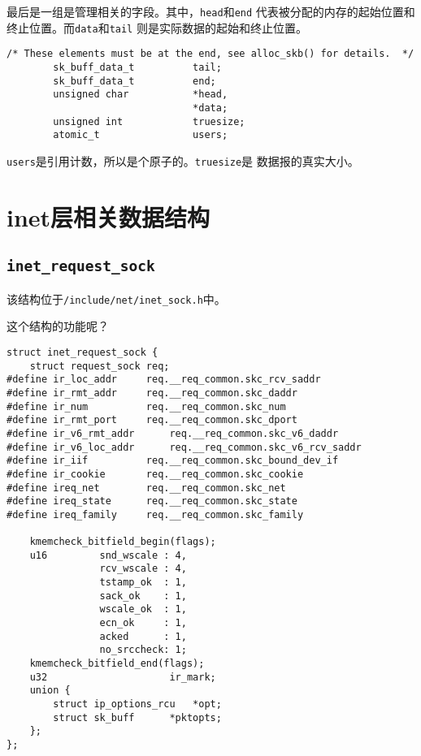 最后是一组是管理相关的字段。其中，\texttt{head}和\texttt{end}
代表被分配的内存的起始位置和终止位置。而\texttt{data}和\texttt{tail}
则是实际数据的起始和终止位置。
\begin{verbatim}
/* These elements must be at the end, see alloc_skb() for details.  */
        sk_buff_data_t          tail;
        sk_buff_data_t          end;
        unsigned char           *head,
                                *data;
        unsigned int            truesize;
        atomic_t                users;
\end{verbatim}
\texttt{users}是引用计数，所以是个原子的。\texttt{truesize}是
数据报的真实大小。
    \section{inet层相关数据结构}    
        \subsection{\texttt{inet_request_sock}}

		该结构位于\texttt{/include/net/inet_sock.h}中。

		这个结构的功能呢？

\begin{verbatim}
struct inet_request_sock {
	struct request_sock	req;
#define ir_loc_addr		req.__req_common.skc_rcv_saddr
#define ir_rmt_addr		req.__req_common.skc_daddr
#define ir_num			req.__req_common.skc_num
#define ir_rmt_port		req.__req_common.skc_dport
#define ir_v6_rmt_addr		req.__req_common.skc_v6_daddr
#define ir_v6_loc_addr		req.__req_common.skc_v6_rcv_saddr
#define ir_iif			req.__req_common.skc_bound_dev_if
#define ir_cookie		req.__req_common.skc_cookie
#define ireq_net		req.__req_common.skc_net
#define ireq_state		req.__req_common.skc_state
#define ireq_family		req.__req_common.skc_family

	kmemcheck_bitfield_begin(flags);
	u16			snd_wscale : 4,
				rcv_wscale : 4,
				tstamp_ok  : 1,
				sack_ok	   : 1,
				wscale_ok  : 1,
				ecn_ok	   : 1,
				acked	   : 1,
				no_srccheck: 1;
	kmemcheck_bitfield_end(flags);
	u32                     ir_mark;
	union {
		struct ip_options_rcu	*opt;
		struct sk_buff		*pktopts;
	};
};
\end{verbatim}     
